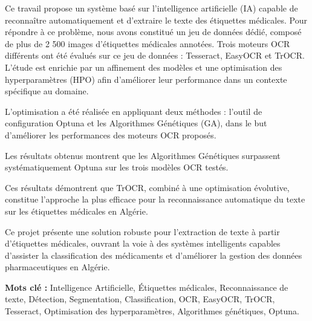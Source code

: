 Ce travail propose un système basé sur l’intelligence artificielle (IA) capable de reconnaître automatiquement et d’extraire le texte des étiquettes médicales. Pour répondre à ce problème, nous avons constitué un jeu de données dédié, composé de plus de 2 500 images d’étiquettes médicales annotées. Trois moteurs OCR différents ont été évalués sur ce jeu de données : Tesseract, EasyOCR et TrOCR. L’étude est enrichie par un affinement des modèles et une optimisation des hyperparamètres (HPO) afin d’améliorer leur performance dans un contexte spécifique au domaine.

L’optimisation a été réalisée en appliquant deux méthodes : l’outil de configuration Optuna et les Algorithmes Génétiques (GA), dans le but d’améliorer les performances des moteurs OCR proposés.

Les résultats obtenus montrent que les Algorithmes Génétiques surpassent systématiquement Optuna sur les trois modèles OCR testés.

Ces résultats démontrent que TrOCR, combiné à une optimisation évolutive, constitue l’approche la plus efficace pour la reconnaissance automatique du texte sur les étiquettes médicales en Algérie.

Ce projet présente une solution robuste pour l’extraction de texte à partir d’étiquettes médicales, ouvrant la voie à des systèmes intelligents capables d’assister la classification des médicaments et d’améliorer la gestion des données pharmaceutiques en Algérie.


\vspace{1cm}



{\textbf{Mots clé :}}
Intelligence Artificielle, Étiquettes médicales, Reconnaissance de texte, Détection, Segmentation, Classification, OCR, EasyOCR, TrOCR, Tesseract, Optimisation des hyperparamètres, Algorithmes génétiques, Optuna.

